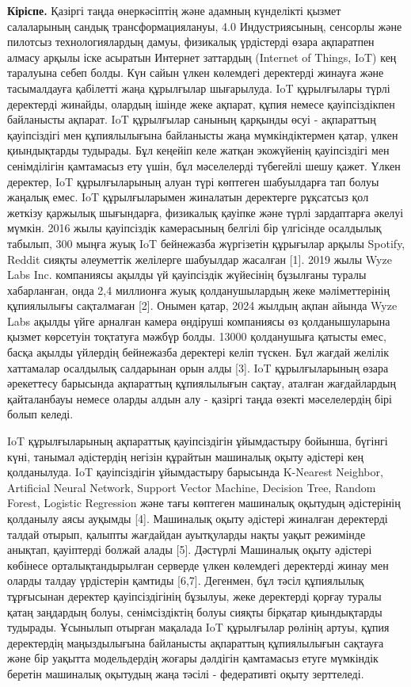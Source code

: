 {\bfseries Кіріспе.} Қазіргі таңда өнеркәсіптің және адамның күнделікті
қызмет салаларының сандық трансформациялануы, 4.0 Индустриясының,
сенсорлы және пилотсыз технологиялардың дамуы, физикалық үрдістерді
өзара ақпаратпен алмасу арқылы іске асыратын Интернет заттардың
(Internet of Things, IoT) кең таралуына себеп болды. Күн сайын үлкен
көлемдегі деректерді жинауға және тасымалдауға қабілетті жаңа құрылғылар
шығарылуда. IoT құрылғылары түрлі деректерді жинайды, олардың ішінде
жеке ақпарат, құпия немесе қауіпсіздікпен байланысты ақпарат. IoT
құрылғылар санының қарқынды өсуі - ақпараттың қауіпсіздігі мен
құпиялылығына байланысты жаңа мүмкіндіктермен қатар, үлкен қиындықтарды
тудырады. Бұл кеңейіп келе жатқан экожүйенің қауіпсіздігі мен
сенімділігін қамтамасыз ету үшін, бұл мәселелерді түбегейлі шешу қажет.
Үлкен деректер, IoT құрылғыларының алуан түрі көптеген шабуылдарға тап
болуы жаңалық емес. IoT құрылғыларымен жиналатын деректерге рұқсатсыз
қол жеткізу қаржылық шығындарға, физикалық қауіпке және түрлі
зардаптарға әкелуі мүмкін. 2016 жылы қауіпсіздік камерасының белгілі бір
үлгісінде осалдылық табылып, 300 мыңға жуық IoT бейнежазба жүргізетін
құрығылар арқылы Spotify, Reddit сияқты әлеуметтік желілерге шабуылдар
жасалған {[}1{]}. 2019 жылы Wyze Labs Inc. компаниясы ақылды үй
қауіпсіздік жүйесінің бұзылғаны туралы хабарланған, онда 2,4 миллионға
жуық қолданушылардың жеке мәліметтерінің құпиялылығы сақталмаған
{[}2{]}. Онымен қатар, 2024 жылдың ақпан айында Wyze Labs ақылды үйге
арналған камера өндіруші компаниясы өз қолданышуларына қызмет көрсетуін
тоқтатуға мәжбүр болды. 13000 қолданушыға қатысты емес, басқа ақылды
үйлердің бейнежазба деректері келіп түскен. Бұл жағдай желілік
хаттамалар осалдылық салдарынан орын алды {[}3{]}. IoT құрылғыларының
өзара әрекеттесу барысында ақпараттың құпиялылығын сақтау, аталған
жағдайлардың қайталанбауы немесе оларды алдын алу - қазіргі таңда өзекті
мәселелердің бірі болып келеді.

IoT құрылғыларының ақпараттық қауіпсіздігін ұйымдастыру бойынша, бүгінгі
күні, танымал әдістердің негізін құрайтын машиналық оқыту әдістері кең
қолданылуда. IoT қауіпсіздігін ұйымдастыру барысында K-Nearest Neighbor,
Artificial Neural Network, Support Vector Machine, Decision Tree, Random
Forest, Logistic Regression және тағы көптеген машиналық оқытудың
әдістерінің қолданылу аясы ауқымды {[}4{]}. Машиналық оқыту әдістері
жиналған деректерді талдай отырып, қалыпты жағдайдан ауытқуларды нақты
уақыт режимінде анықтап, қауіптерді болжай алады {[}5{]}. Дәстүрлі
Машиналық оқыту әдістері көбінесе орталықтандырылған серверде үлкен
көлемдегі деректерді жинау мен оларды талдау үрдістерін қамтиды
{[}6,7{]}. Дегенмен, бұл тәсіл құпиялылық тұрғысынан деректер
қауіпсіздігінің бұзылуы, жеке деректерді қорғау туралы қатаң заңдардың
болуы, сенімсіздіктің болуы сияқты бірқатар қиындықтарды тудырады.
Ұсынылып отырған мақалада IoT құрылғылар рөлінің артуы, құпия
деректердің маңыздылығына байланысты ақпараттың құпиялылығын сақтауға
және бір уақытта модельдердің жоғары дәлдігін қамтамасыз етуге мүмкіндік
беретін машиналық оқытудың жаңа тәсілі - федеративті оқыту зерттеледі.

